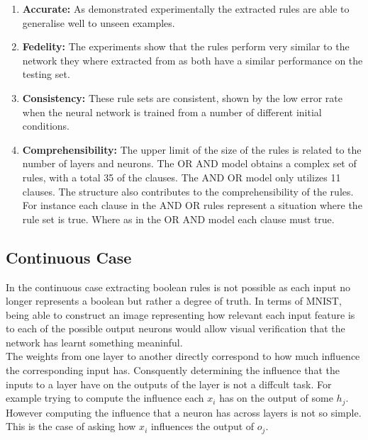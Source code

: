 \begin{enumerate}
	\item \textbf{Accurate:} As demonstrated experimentally the extracted rules are able to generalise well to unseen examples.
	\item \textbf{Fedelity:} The experiments show that the rules perform very similar to the network they where extracted from as both have a similar performance on the testing set.
	\item \textbf{Consistency:} These rule sets are consistent, shown by the low error rate when the neural network is trained from a number of different initial conditions.
	\item \textbf{Comprehensibility:} The upper limit of the size of the rules is related to the number of layers and neurons. The OR AND model obtains a complex set of rules, with a total 35 of the clauses. The AND OR model only utilizes 11 clauses. The structure also contributes to the comprehensibility of the rules. For instance each clause in the AND OR rules represent a situation where the rule set is true. Where as in the OR AND model each clause must true.
\end{enumerate}

\subsection{Continuous Case}
In the continuous case extracting boolean rules is not possible as each input no longer represents a boolean but rather a degree of truth. In terms of MNIST, being able to construct an image representing how relevant each input feature is to each of the possible output neurons would allow visual verification that the network has learnt something meaninful.\\

The weights from one layer to another directly correspond to how much influence the corresponding input has. Consquently determining the influence that the inputs to a layer have on the outputs of the layer is not a diffcult task. For example trying to compute the influence each $x_i$ has on the output of some $h_j$. However computing the influence that a neuron has across layers is not so simple. This is the case of asking how $x_i$ influences the output of $o_j$.

